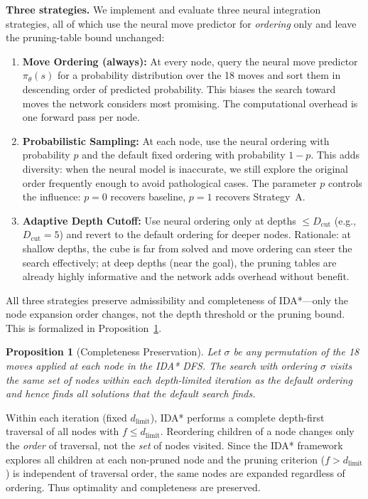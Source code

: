 \documentclass[conference]{IEEEtran}
\newtheorem{proposition}[theorem]{Proposition}
\begin{document}
\textbf{Three strategies.} We implement and evaluate three neural integration strategies, all of which use the neural move predictor for \emph{ordering} only and leave the pruning-table bound unchanged:

\begin{enumerate}[leftmargin=*]
  \item[\textbf{(A)}] \textbf{Move Ordering (always):} At every node, query the neural move predictor $\pi_\theta(s)$ for a probability distribution over the 18 moves and sort them in descending order of predicted probability. This biases the search toward moves the network considers most promising. The computational overhead is one forward pass per node.
  \item[\textbf{(B)}] \textbf{Probabilistic Sampling:} At each node, use the neural ordering with probability $p$ and the default fixed ordering with probability $1-p$. This adds diversity: when the neural model is inaccurate, we still explore the original order frequently enough to avoid pathological cases. The parameter $p$ controls the influence: $p=0$ recovers baseline, $p=1$ recovers Strategy~A.
  \item[\textbf{(C)}] \textbf{Adaptive Depth Cutoff:} Use neural ordering only at depths $\leq D_{\mathrm{cut}}$ (e.g., $D_{\mathrm{cut}} = 5$) and revert to the default ordering for deeper nodes. Rationale: at shallow depths, the cube is far from solved and move ordering can steer the search effectively; at deep depths (near the goal), the pruning tables are already highly informative and the network adds overhead without benefit.
\end{enumerate}

All three strategies preserve admissibility and completeness of IDA*---only the node expansion order changes, not the depth threshold or the pruning bound. This is formalized in Proposition~\ref{prop:completeness}.

\begin{proposition}[Completeness Preservation]
\label{prop:completeness}
Let $\sigma$ be any permutation of the 18 moves applied at each node in the IDA* DFS. The search with ordering $\sigma$ visits the same set of nodes within each depth-limited iteration as the default ordering and hence finds all solutions that the default search finds.
\end{proposition}

\begin{IEEEproof}
Within each iteration (fixed $d_{\text{limit}}$), IDA* performs a complete depth-first traversal of all nodes with $f \leq d_{\text{limit}}$. Reordering children of a node changes only the \emph{order} of traversal, not the \emph{set} of nodes visited. Since the IDA* framework explores all children at each non-pruned node and the pruning criterion ($f > d_{\text{limit}}$) is independent of traversal order, the same nodes are expanded regardless of ordering. Thus optimality and completeness are preserved.
\end{IEEEproof}
\end{document}
